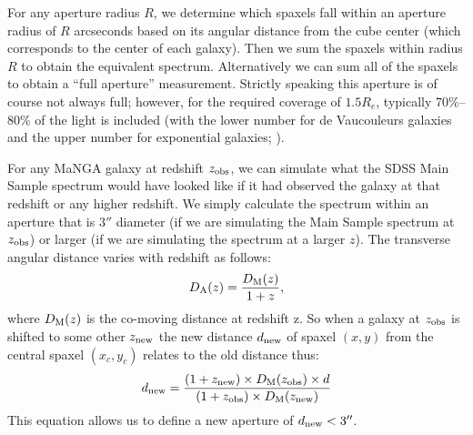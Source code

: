 For any aperture radius $R$, we determine which 
spaxels fall within an aperture radius of $R$ 
arcseconds based on its angular distance from the 
cube center (which corresponds to the center of 
each galaxy). Then we sum the spaxels within radius $R$ 
to obtain the equivalent spectrum. Alternatively we 
can sum all of the spaxels to obtain a ``full aperture''
measurement. Strictly speaking this aperture is of
course not always full; however, for the required
coverage of $1.5R_e$, typically 70\%--80\% of the 
light is included (with the lower number for de Vaucouleurs
galaxies and the upper number for exponential galaxies;
\citealt{graham05a}).




For any MaNGA galaxy at redshift $z_{\rm obs}$, we can simulate what
the SDSS Main Sample spectrum would have looked like if it had observed the 
galaxy at that redshift or any higher redshift. We simply calculate the 
spectrum within an aperture that is 3$''$ diameter (if we are simulating 
the Main Sample spectrum at $z_{\rm obs}$) or larger (if we are simulating
the spectrum at a larger $z$).
The transverse angular distance varies with redshift as follows:
$$D_{\rm A}(z) = \frac{D_{\rm M}(z)}{1+z}, $$
where $D_{\rm M}(z)$ is the co-moving distance at redshift z.
So when a galaxy at $z_{\rm obs}$ is shifted to some other
$z_{\rm new}$ the new distance $d_{\rm new}$ of spaxel $(x,y)$ 
from the central spaxel $(x_{c},y_{c})$ relates to the old distance thus:
$$ d_{\rm new} = \frac{(1+z_{\rm new})\times D_{\rm M}(z_{\rm obs}) \times d}{(1+z_{\rm obs}) \times  D_{\rm M}(z_{\rm new})} $$
This equation allows us to define a new aperture of $d_{\rm new} < 3''$.

